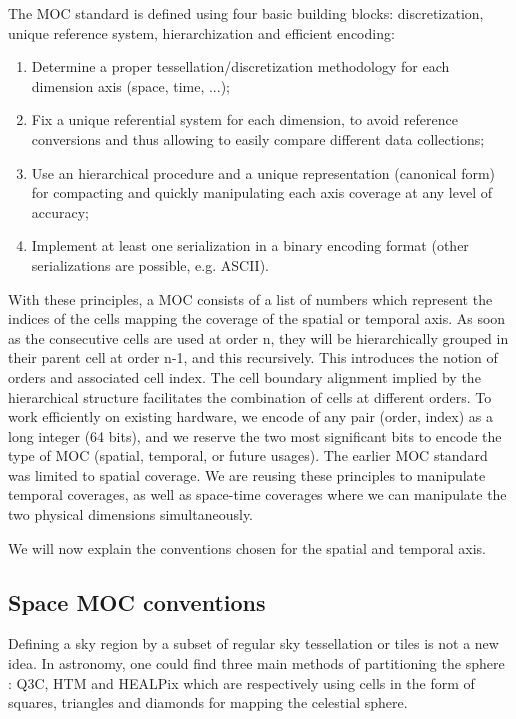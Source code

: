 \documentclass[11pt,a4paper]{ivoa}
\begin{document}
The MOC standard is defined using four basic building blocks:
discretization, unique reference system, hierarchization and efficient
encoding: 

\begin{enumerate}
\item Determine a proper tessellation/discretization methodology for
  each dimension axis (space, time, ...);
\item Fix a unique referential system for each dimension, to avoid 
  reference conversions and thus allowing to easily compare different
  data collections; 
\item Use an hierarchical procedure and a unique representation
  (canonical form) for compacting and quickly manipulating each axis
  coverage at any level of accuracy;
\item Implement at least one serialization in a binary encoding format
  (other serializations are possible, e.g. ASCII). 
\end{enumerate} 

With these principles, a MOC consists of a list of numbers which
represent the indices of the cells mapping the coverage of the spatial
or temporal axis.
As soon as the consecutive cells are used at order n, they will be
hierarchically grouped in their parent cell at order n-1, and
this recursively. This introduces the notion of orders and
associated cell index.
The cell boundary alignment implied by the hierarchical structure
facilitates the combination of cells at different orders. 
To work efficiently on existing hardware, we encode of any pair
(order, index) as a long integer (64 bits), and we reserve the two
most significant bits to encode the type of MOC (spatial, temporal,
or future usages). 
The earlier MOC standard was limited to spatial coverage.
We are reusing these principles to manipulate temporal coverages,
as well as space-time coverages where we can manipulate the two
physical dimensions simultaneously.

\medskip
\par\noindent
We will now explain the conventions chosen for the spatial and temporal axis.

\subsection{Space MOC conventions}
Defining a sky region by a subset of regular sky tessellation or tiles
is not a new idea.  In astronomy, one could find three main methods of
partitioning the sphere : Q3C, HTM and HEALPix which are respectively
using cells in the form of squares, triangles and diamonds for mapping
the celestial sphere.
\end{document}
